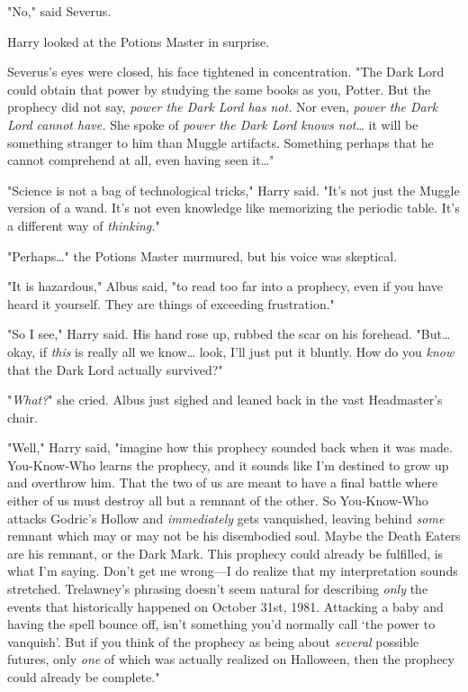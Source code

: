 "No," said Severus.

Harry looked at the Potions Master in surprise.

Severus's eyes were closed, his face tightened in concentration. "The Dark Lord 
could obtain that power by studying the same books as you, Potter. But the 
prophecy did not say, \emph{power the Dark Lord has not.} Nor even, \emph{power 
the Dark Lord cannot have.} She spoke of \emph{power the Dark Lord knows 
not}{\ldots} it will be something stranger to him than Muggle artifacts. 
Something perhaps that he cannot comprehend at all, even having seen it{\ldots}"

"Science is not a bag of technological tricks," Harry said. "It's not just the 
Muggle version of a wand. It's not even knowledge like memorizing the periodic 
table. It's a different way of \emph{thinking.}"

"Perhaps{\ldots}" the Potions Master murmured, but his voice was skeptical.

"It is hazardous," Albus said, "to read too far into a prophecy, even if you 
have heard it yourself. They are things of exceeding frustration."

"So I see," Harry said. His hand rose up, rubbed the scar on his forehead. 
"But{\ldots} okay, if \emph{this} is really all we know{\ldots} look, I'll just 
put it bluntly. How do you \emph{know} that the Dark Lord actually survived?"

"\emph{What?}" she cried. Albus just sighed and leaned back in the vast 
Headmaster's chair.

"Well," Harry said, "imagine how this prophecy sounded back when it was made. 
You-Know-Who learns the prophecy, and it sounds like I'm destined to grow up 
and overthrow him. That the two of us are meant to have a final battle where 
either of us must destroy all but a remnant of the other. So You-Know-Who 
attacks Godric's Hollow and \emph{immediately} gets vanquished, leaving behind 
\emph{some} remnant which may or may not be his disembodied soul. Maybe the 
Death Eaters are his remnant, or the Dark Mark. This prophecy could already be 
fulfilled, is what I'm saying. Don't get me wrong---I do realize that my 
interpretation sounds stretched. Trelawney's phrasing doesn't seem natural for 
describing \emph{only} the events that historically happened on October 31st, 
1981. Attacking a baby and having the spell bounce off, isn't something you'd 
normally call `the power to vanquish'. But if you think of the prophecy as 
being about \emph{several} possible futures, only \emph{one} of which was 
actually realized on Halloween, then the prophecy could already be complete."

